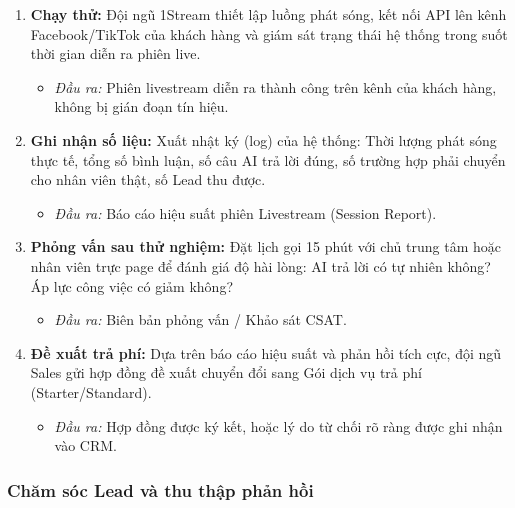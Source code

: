 \begin{enumerate}
    \begin{itemize}
        \item \textit{Đầu ra:} Email/Tin nhắn xác nhận "Approve" (Đồng ý phát sóng) từ khách hàng.
    \end{itemize}
    \item \textbf{Chạy thử:} Đội ngũ 1Stream thiết lập luồng phát sóng, kết nối API lên kênh Facebook/TikTok của khách hàng và giám sát trạng thái hệ thống trong suốt thời gian diễn ra phiên live.
    \begin{itemize}
        \item \textit{Đầu ra:} Phiên livestream diễn ra thành công trên kênh của khách hàng, không bị gián đoạn tín hiệu.
    \end{itemize}
    \item \textbf{Ghi nhận số liệu:} Xuất nhật ký (log) của hệ thống: Thời lượng phát sóng thực tế, tổng số bình luận, số câu AI trả lời đúng, số trường hợp phải chuyển cho nhân viên thật, số Lead thu được.
    \begin{itemize}
        \item \textit{Đầu ra:} Báo cáo hiệu suất phiên Livestream (Session Report).
    \end{itemize}
    \item \textbf{Phỏng vấn sau thử nghiệm:} Đặt lịch gọi 15 phút với chủ trung tâm hoặc nhân viên trực page để đánh giá độ hài lòng: AI trả lời có tự nhiên không? Áp lực công việc có giảm không?
    \begin{itemize}
        \item \textit{Đầu ra:} Biên bản phỏng vấn / Khảo sát CSAT.
    \end{itemize}
    \item \textbf{Đề xuất trả phí:} Dựa trên báo cáo hiệu suất và phản hồi tích cực, đội ngũ Sales gửi hợp đồng đề xuất chuyển đổi sang Gói dịch vụ trả phí (Starter/Standard).
    \begin{itemize}
        \item \textit{Đầu ra:} Hợp đồng được ký kết, hoặc lý do từ chối rõ ràng được ghi nhận vào CRM.
    \end{itemize}
\end{enumerate}

\subsubsection{Chăm sóc Lead và thu thập phản hồi}

